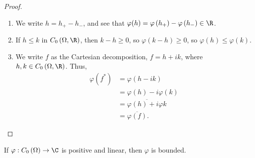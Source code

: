 \documentclass[10pt]{mypackage}
\begin{document}
\begin{proof}\hfill
  \begin{enumerate}[(1)]
    \item We write $h = h_{+} - h_{-}$, and see that $\varphi(h) = \varphi\left(h_{+}\right) - \varphi\left(h_{-}\right) \in \R$.
    \item If $h \leq k$ in $C_0\left(\Omega,\R\right)$, then $k-h\geq 0$, so $\varphi\left(k-h\right) \geq 0$, so $\varphi\left(h\right)\leq \varphi\left(k\right)$.
      \item We write $f$ as the Cartesian decomposition, $f = h + ik$, where $h,k\in C_0\left(\Omega,\R\right)$. Thus,
        \begin{align*}
          \varphi\left(f^{\ast}\right) &= \varphi\left(h-ik\right)\\
                                       &= \varphi\left(h\right) - i\varphi\left(k\right)\\
                                       &= \overline{\varphi(h) + i\varphi{k}}\\
                                       &= \overline{\varphi(f)}.
        \end{align*}
  \end{enumerate}
\end{proof}
\begin{proposition}
  If $\varphi: C_0\left(\Omega\right)\rightarrow \C$ is positive and linear, then $\varphi$ is bounded.
\end{proposition}
\end{document}

